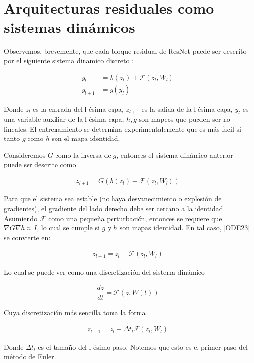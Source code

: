 \documentclass[titlepage,a4paper,oneside]{article}
\begin{document}
\section{Arquitecturas residuales como sistemas dinámicos}
Observemos, brevemente, que cada bloque residual de ResNet puede ser descrito por el siguiente sistema dinamico discreto \cite{E-2017}:

\begin{align}\label{ODE_ResNet}
	    y_l &= h(z_l) + \mathscr{F}(z_l, W_l)\\
	y_{l+1} &= g(y_l)
\end{align}

Donde $z_l$ es la entrada del l-ésima capa, $z_{l+1}$ es la salida de la l-ésima capa, $y_l$ es una variable auxiliar de la l-ésima capa, $h, g$ son mapeos que pueden ser no-lineales. El entrenamiento se determina experimentalemente \cite{he2016identity} que es más fácil si tanto $g$ como $h$ son el mapa identidad.

Consideremos $G$ como la inversa de $g$, entonces el sistema dinámico anterior puede ser descrito como

\begin{align}\label{ODE23}
	z_{l+1} = G(h(z_l) + \mathscr{F}(z_l, W_l))
\end{align}

Para que el sistema sea estable (no haya desvanecimiento o explosión de gradientes), el gradiente del lado derecho debe ser cercano a la identidad. Asumiendo $\mathscr{F}$ como una pequeña perturbación, entonces se requiere que $\nabla G \nabla h \approx I$, lo cual se cumple si $g$ y $h$ son mapas identidad. En tal caso, \ref{ODE23} se convierte en:

\begin{align}
	z_{l+1} = z_l + \mathscr{F}(z_l, W_l)
\end{align}

Lo cual se puede ver como una discretización del sistema dinámico

\begin{align}
	\dfrac{dz}{dt} = \mathscr{F}(z, W(t))
\end{align}

Cuya discretización más sencilla toma la forma

\begin{align}
	z_{l+1} = z_l + \Delta t_l \mathscr{F}(z_l, W_l)
\end{align}

Donde $\Delta t_l$ es el tamaño del l-ésimo paso. Notemos que esto es el primer paso del método de Euler.
\end{document}
